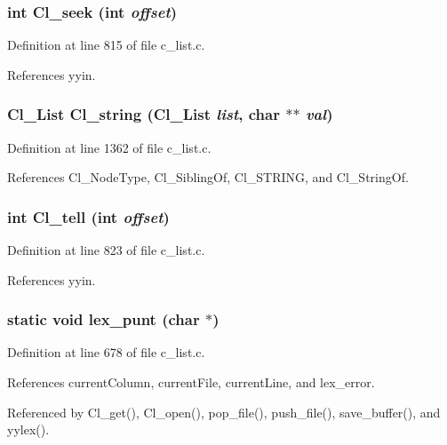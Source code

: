 \subsubsection{\setlength{\rightskip}{0pt plus 5cm}int Cl\_\-seek (int {\em offset})}\label{c__list_8c_658b1885587436cb4eaf602ff8593413}




Definition at line 815 of file c\_\-list.c.

References yyin.
\subsubsection{\setlength{\rightskip}{0pt plus 5cm}\bf{Cl\_\-List} Cl\_\-string (\bf{Cl\_\-List} {\em list}, char $\ast$$\ast$ {\em val})}\label{c__list_8c_d970539c2fc1445ccc3e49fa20b4d42b}




Definition at line 1362 of file c\_\-list.c.

References Cl\_\-Node\-Type, Cl\_\-Sibling\-Of, Cl\_\-STRING, and Cl\_\-String\-Of.
\subsubsection{\setlength{\rightskip}{0pt plus 5cm}int Cl\_\-tell (int {\em offset})}\label{c__list_8c_ccfa9ee87e61a5dd4fe7e357d4580294}




Definition at line 823 of file c\_\-list.c.

References yyin.
\subsubsection{\setlength{\rightskip}{0pt plus 5cm}static void lex\_\-punt (char $\ast$)\hspace{0.3cm}{\tt  [static]}}\label{c__list_8c_33a2072362269d636f54dd7f3538a60c}




Definition at line 678 of file c\_\-list.c.

References current\-Column, current\-File, current\-Line, and lex\_\-error.

Referenced by Cl\_\-get(), Cl\_\-open(), pop\_\-file(), push\_\-file(), save\_\-buffer(), and yylex().
